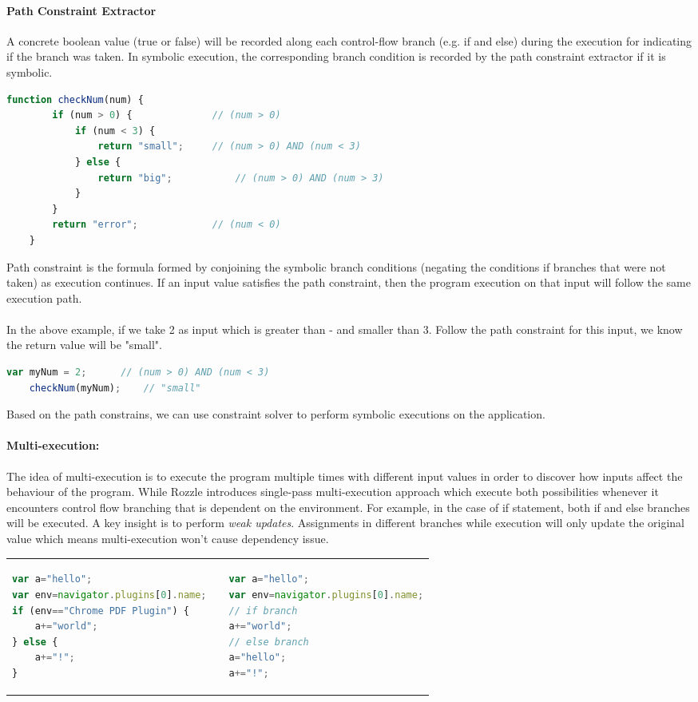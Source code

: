 \paragraph{Path Constraint Extractor}
A concrete boolean value (true or false) will be recorded along each control-flow branch (e.g. if and else) during the execution for indicating if the branch was taken. In symbolic execution, the corresponding branch condition is recorded by the path constraint extractor if it is symbolic. 
\begin{lstlisting}[language=JavaScript, title=(example path constrains) ]
	function checkNum(num) {
		if (num > 0) {				// (num > 0)
			if (num < 3) {
				return "small";		// (num > 0) AND (num < 3)
			} else {
				return "big";			// (num > 0) AND (num > 3)
			}
		}
		return "error";				// (num < 0)
	}
\end{lstlisting} 
Path constraint is the formula formed by conjoining the symbolic branch conditions (negating the conditions if branches that were not taken) as execution continues. If an input value satisfies the path constraint, then the program execution on that input will follow the same execution path.\\  \\ In the above example, if we take 2 as input which is greater than - and smaller than 3. Follow the path constraint for this input, we know the return value will be "small".
\begin{lstlisting}[language=JavaScript]
	var myNum = 2;		// (num > 0) AND (num < 3)
	checkNum(myNum);	// "small"
\end{lstlisting} 
Based on the path constrains, we can use constraint solver to perform symbolic executions on the application.
\paragraph{Multi-execution:}
The idea of multi-execution is to execute the program multiple times with different input values in order to discover how inputs affect the behaviour of the program. While Rozzle\cite{Rozzle} introduces single-pass multi-execution approach which execute both possibilities whenever it encounters control flow branching that is dependent on the environment. For example, in the case of if statement, both if and else branches will be executed. A key insight is to perform \textit{weak updates}. Assignments in different branches while execution will only update the original value which means multi-execution won't cause dependency issue. \\
\begin{tabular}{p{7.5cm}p{0.5cm}p{7.5cm}}
			\begin{lstlisting}[language=JavaScript, title=(original code)]
var a="hello";
var env=navigator.plugins[0].name;
if (env=="Chrome PDF Plugin") {
    a+="world"; 
} else {
    a+="!"; 
}
			\end{lstlisting} & & \begin{lstlisting}[language=JavaScript, title=(single-pass multi-execution) ]
var a="hello";
var env=navigator.plugins[0].name;
// if branch
a+="world"; 
// else branch
a="hello";
a+="!"; 
			\end{lstlisting} 
	\end{tabular}  
\newpage
